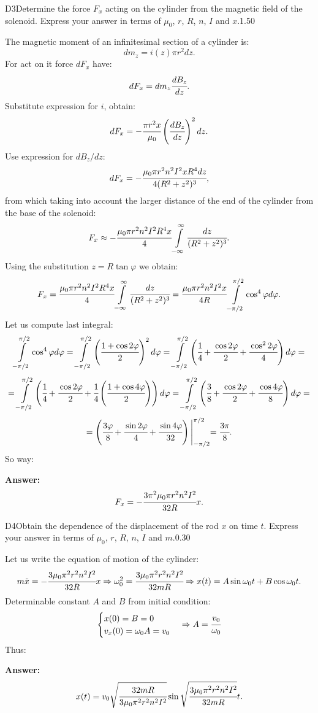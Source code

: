 \documentclass[11pt,a4paper]{article}
\begin{document}
\begin{solcard}{D3}{Determine the force $F_x$ acting on the cylinder from the magnetic field of the solenoid. Express your answer in terms of $\mu_0$, $r$, $R$, $n$, $I$ and $x$.}{1.50}

The magnetic moment of an infinitesimal section of a cylinder is: $$dm_z=i(z)\pi r^2dz{.} $$For act on it force $dF_x$ have: $$dF_x=dm_z\cfrac{dB_z}{dz}{.} $$Substitute expression for $i$, obtain: $$dF_x=-\cfrac{\pi{r}^2x}{\mu_0}\left(\cfrac{dB_z}{dz}\right)^2dz{.} $$Use expression for $dB_z/dz$: $$dF_x=-\cfrac{\mu_0\pi{r}^2n^2I^2xR^4dz}{4(R^2+z^2)^3}{,} $$from which taking into account the larger distance of the end of the cylinder from the base of the solenoid: $$F_x\approx -\cfrac{\mu_0\pi{r}^2n^2I^2R^4x}{4}\int\limits_{-\infty}^{\infty}\cfrac{dz}{(R^2+z^2)^3}{.} $$Using the substitution $z = R\tan\varphi$ we obtain: $$F_x=\cfrac{\mu_0\pi{r}^2n^2I^2R^4x}{4}\int\limits_{-\infty}^{\infty}\cfrac{dz}{(R^2+z^2)^3}=\cfrac{\mu_0\pi{r}^2n^2I^2x}{4R}\int\limits_{-\pi/2}^{\pi/2}\cos^4\varphi d\varphi{.} $$Let us compute last integral: $$\int\limits_{-\pi/2}^{\pi/2}\cos^4\varphi d\varphi=\int\limits_{-\pi/2}^{\pi/2}\left(\cfrac{1+\cos 2\varphi}{2}\right)^2d\varphi=\int\limits_{-\pi/2}^{\pi/2}\left(\cfrac{1}{4}+\cfrac{\cos 2\varphi}{2}+\cfrac{\cos^22\varphi}{4}\right)d\varphi= $$ $$=\int\limits_{-\pi/2}^{\pi/2}\left(\cfrac{1}{4}+\cfrac{\cos 2\varphi}{2}+\cfrac{1}{4}\left(\cfrac{1+\cos 4\varphi}{2}\right)\right)d\varphi=\int\limits_{-\pi/2}^{\pi/2}\left(\cfrac{3}{8}+\cfrac{\cos 2\varphi}{2}+\cfrac{\cos 4\varphi}{8}\right)d\varphi= $$ $$=\left(\cfrac{3\varphi}{8}+\cfrac{\sin 2\varphi}{4}+\cfrac{\sin 4\varphi}{32}\right)\Biggl|_{-\pi/2}^{\pi/2}=\cfrac{3\pi}{8}{.} $$So way:

\par\smallskip\noindent\textbf{Answer:} $$F_x=-\cfrac{3\pi^2\mu_0\pi r^2n^2I^2}{32R}x{.} $$
\end{solcard}

\begin{solcard}{D4}{Obtain the dependence of the displacement of the rod $x$ on time $t$. Express your answer in terms of $\mu_0$, $r$, $R$, $n$, $I$ and $m$.}{0.30}

Let us write the equation of motion of the cylinder: $$m\ddot{x}=-\cfrac{3\mu_0\pi^2 r^2n^2I^2}{32R}x\Rightarrow \omega^2_0=\cfrac{3\mu_0\pi^2 r^2n^2I^2}{32mR}\Rightarrow x(t)=A\sin\omega_0t+B\cos\omega_0t{.} $$Determinable constant $A$ and $B$ from initial condition: $$ \begin{cases} x(0)=B=0\\ v_x(0)=\omega_0A=v_0 \end{cases} \Rightarrow A=\cfrac{v_0}{\omega_0} $$Thus:

\par\smallskip\noindent\textbf{Answer:} $$x(t)=v_0\sqrt{\cfrac{32mR}{3\mu_0\pi^2{r}^2n^2I^2}}\sin\sqrt{\cfrac{3\mu_0\pi^2 r^2n^2I^2}{32mR}}t{.} $$
\end{solcard}
\end{document}
